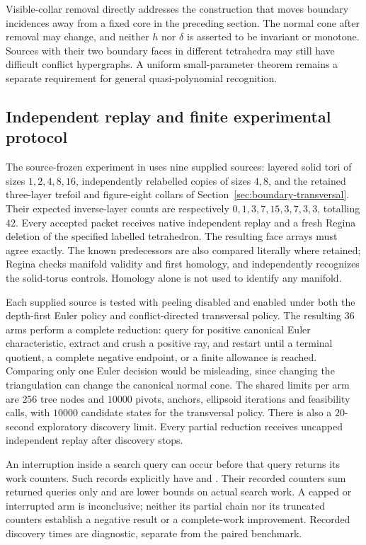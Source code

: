 Visible-collar removal directly addresses the construction that moves
boundary incidences away from a fixed core in the preceding section.
The normal cone after removal may change, and neither $h$ nor $\delta$
is asserted to be invariant or monotone.  Sources with their two
boundary faces in different tetrahedra may still have difficult conflict
hypergraphs.  A uniform small-parameter theorem remains a separate
requirement for general quasi-polynomial recognition.

\subsection{Independent replay and finite experimental protocol}

The source-frozen experiment in
 uses nine supplied sources:
layered solid tori of sizes $1,2,4,8,16$, independently relabelled
copies of sizes $4,8$, and the retained three-layer trefoil and
figure-eight collars of Section~\ref{sec:boundary-transversal}.
Their expected inverse-layer counts are respectively
$0,1,3,7,15,3,7,3,3$, totalling $42$.  Every accepted packet receives
native independent replay and a fresh Regina deletion of the specified
labelled tetrahedron.  The resulting face arrays must agree exactly.
The known predecessors are also compared literally where retained;
Regina checks manifold validity and first homology, and independently
recognizes the solid-torus controls.  Homology alone is not used to
identify any manifold.

Each supplied source is tested with peeling disabled and enabled under
both the depth-first Euler policy and conflict-directed transversal
policy.  The resulting $36$ arms perform a complete reduction:
query for positive canonical Euler characteristic, extract and crush
a positive ray, and restart until a terminal quotient, a complete
negative endpoint, or a finite allowance is reached.  Comparing only
one Euler decision would be misleading, since changing the
triangulation can change the canonical normal cone.  The shared limits
per arm are $256$ tree nodes and $10000$ pivots, anchors, ellipsoid
iterations and feasibility calls, with $10000$ candidate states for
the transversal policy.  There is also a $20$-second exploratory
discovery limit.  Every partial reduction receives uncapped independent
replay after discovery stops.

An interruption inside a search query can occur before that query
returns its work counters.  Such records explicitly have
 and .
Their recorded counters sum returned queries only and are lower bounds
on actual search work.  A capped or interrupted arm is inconclusive;
neither its partial chain nor its truncated counters establish a
negative result or a complete-work improvement.  Recorded discovery
times are diagnostic, separate from the paired benchmark.

